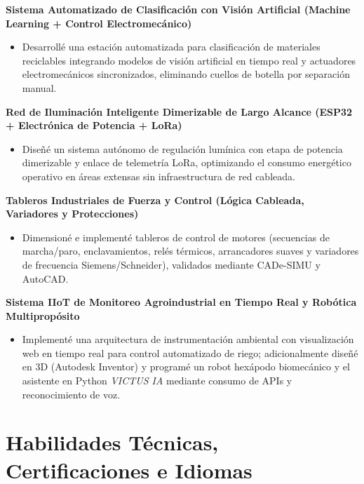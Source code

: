 \documentclass[10pt,a4paper]{article}
\begin{document}
\textbf{Sistema Automatizado de Clasificación con Visión Artificial (Machine Learning + Control Electromecánico)}
\begin{itemize}
    \item Desarrollé una estación automatizada para clasificación de materiales reciclables integrando modelos de visión artificial en tiempo real y actuadores electromecánicos sincronizados, eliminando cuellos de botella por separación manual.
\end{itemize}
\vspace{2pt}

\textbf{Red de Iluminación Inteligente Dimerizable de Largo Alcance (ESP32 + Electrónica de Potencia + LoRa)}
\begin{itemize}
    \item Diseñé un sistema autónomo de regulación lumínica con etapa de potencia dimerizable y enlace de telemetría LoRa, optimizando el consumo energético operativo en áreas extensas sin infraestructura de red cableada.
\end{itemize}
\vspace{2pt}

\textbf{Tableros Industriales de Fuerza y Control (Lógica Cableada, Variadores y Protecciones)}
\begin{itemize}
    \item Dimensioné e implementé tableros de control de motores (secuencias de marcha/paro, enclavamientos, relés térmicos, arrancadores suaves y variadores de frecuencia Siemens/Schneider), validados mediante CADe-SIMU y AutoCAD.
\end{itemize}
\vspace{2pt}

\textbf{Sistema IIoT de Monitoreo Agroindustrial en Tiempo Real y Robótica Multipropósito}
\begin{itemize}
    \item Implementé una arquitectura de instrumentación ambiental con visualización web en tiempo real para control automatizado de riego; adicionalmente diseñé en 3D (Autodesk Inventor) y programé un robot hexápodo biomecánico y el asistente en Python \textit{VICTUS IA} mediante consumo de APIs y reconocimiento de voz.
\end{itemize}

\section{Habilidades Técnicas, Certificaciones e Idiomas}
\end{document}
